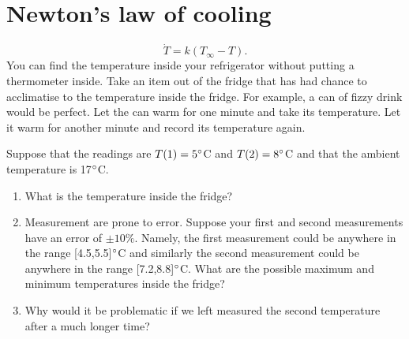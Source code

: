 \documentclass[10pt]{article}
\newcommand{\bb}{\begin{equation}}
\newcommand{\ee}{\end{equation}}
\begin{document}
\section{Newton's law of cooling}
\bb
\dot{T}=k(T_\infty-T)\label{Newtons_law_cooling}.
\ee
You can find the temperature inside your refrigerator without putting a thermometer inside. Take an item out of the fridge that has had chance to acclimatise to the temperature inside the fridge. For example, a can of fizzy drink would be perfect. Let the can warm for one minute and take its temperature. Let it warm for another minute and record its temperature again.

Suppose that the readings are $T(1) = 5\degree$C and $T(2)=8\degree$C and that the ambient temperature is 17$\degree$C.

\begin{enumerate}
\item What is the temperature inside the fridge?
\item Measurement are prone to error. Suppose your first and second measurements have an error of $\pm10\%$. Namely, the first measurement could be anywhere in the range [4.5,5.5]$\degree$C and similarly the second measurement could be anywhere in the range [7.2,8.8]$\degree$C. What are the possible maximum and minimum temperatures inside the fridge?
\item Why would it be problematic if we left measured the second temperature after a much longer time?
\end{enumerate}
\end{document}
